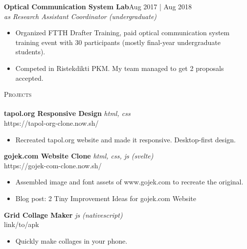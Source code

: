 \documentclass[a4paper]{article}
\newcommand{\lineunder} {
    \vspace*{-8pt} \\
    \hspace*{-18pt} \hrulefill \\
}
\newcommand{\header} [1] {
    {\hspace*{-18pt}\vspace*{6pt} \textsc{#1}}
    \vspace*{-6pt} \lineunder
}
\begin{document}
\textbf{Optical Communication System Lab}\hfill Aug 2017 | Aug 2018\\
\textit{as Research Assistant Coordinator (undergraduate)} \\
\vspace{-1mm}
\begin{itemize} \itemsep 1pt
  \item Organized FTTH Drafter Training, paid optical communication system training event with 30 participants (mostly final-year undergraduate students).
  \item Competed in Ristekdikti PKM. My team managed to get 2 proposals accepted.
  
\end{itemize}


\header{Projects}

{\textbf{tapol.org Responsive Design}} \hfill {\sl html, css}\\https://tapol-org-clone.now.sh/\\
\vspace{-1mm}
\begin{itemize} \itemsep 1pt
	\item Recreated tapol.org website and made it responsive. Desktop-first design.
\end{itemize}

\vspace*{2mm}
{\textbf{gojek.com Website Clone}} \hfill {\sl html, css, js (svelte)}\\https://gojek-com-clone.now.sh/\\
\vspace{-1mm}
\begin{itemize} \itemsep 1pt
	\item Assembled image and font assets of www.gojek.com to recreate the original.
    \item Blog post: 2 Tiny Improvement Ideas for gojek.com Website
\end{itemize}

\vspace*{2mm}
{\textbf{Grid Collage Maker}} \hfill {\sl js (nativescript)}\\link/to/apk\\
\vspace{-1mm}
\begin{itemize} \itemsep 1pt
	\item Quickly make collages in your phone.
\end{itemize}

\vspace*{2mm}
\end{document}
